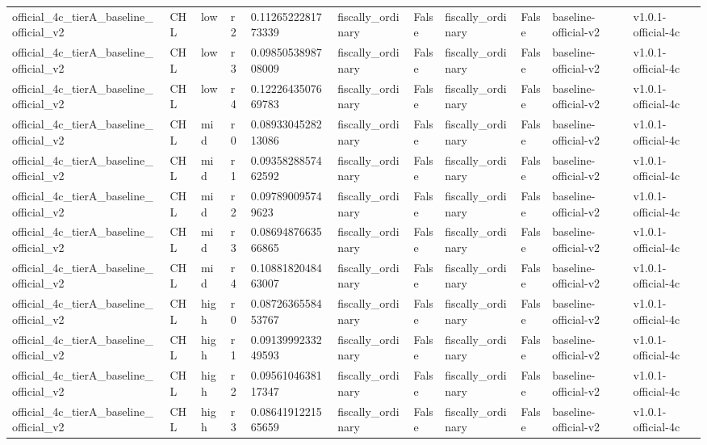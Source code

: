 \begin{table}[!htbp]
\begin{tabular}{lllllllllll}
official\_4c\_tierA\_baseline\_official\_v2 & CHL & low & r2 & 0.1126522281773339 & fiscally\_ordinary & False & fiscally\_ordinary & False & baseline-official-v2 & v1.0.1-official-4c \\
official\_4c\_tierA\_baseline\_official\_v2 & CHL & low & r3 & 0.0985053898708009 & fiscally\_ordinary & False & fiscally\_ordinary & False & baseline-official-v2 & v1.0.1-official-4c \\
official\_4c\_tierA\_baseline\_official\_v2 & CHL & low & r4 & 0.1222643507669783 & fiscally\_ordinary & False & fiscally\_ordinary & False & baseline-official-v2 & v1.0.1-official-4c \\
official\_4c\_tierA\_baseline\_official\_v2 & CHL & mid & r0 & 0.0893304528213086 & fiscally\_ordinary & False & fiscally\_ordinary & False & baseline-official-v2 & v1.0.1-official-4c \\
official\_4c\_tierA\_baseline\_official\_v2 & CHL & mid & r1 & 0.0935828857462592 & fiscally\_ordinary & False & fiscally\_ordinary & False & baseline-official-v2 & v1.0.1-official-4c \\
official\_4c\_tierA\_baseline\_official\_v2 & CHL & mid & r2 & 0.097890095749623 & fiscally\_ordinary & False & fiscally\_ordinary & False & baseline-official-v2 & v1.0.1-official-4c \\
official\_4c\_tierA\_baseline\_official\_v2 & CHL & mid & r3 & 0.0869487663566865 & fiscally\_ordinary & False & fiscally\_ordinary & False & baseline-official-v2 & v1.0.1-official-4c \\
official\_4c\_tierA\_baseline\_official\_v2 & CHL & mid & r4 & 0.1088182048463007 & fiscally\_ordinary & False & fiscally\_ordinary & False & baseline-official-v2 & v1.0.1-official-4c \\
official\_4c\_tierA\_baseline\_official\_v2 & CHL & high & r0 & 0.0872636558453767 & fiscally\_ordinary & False & fiscally\_ordinary & False & baseline-official-v2 & v1.0.1-official-4c \\
official\_4c\_tierA\_baseline\_official\_v2 & CHL & high & r1 & 0.0913999233249593 & fiscally\_ordinary & False & fiscally\_ordinary & False & baseline-official-v2 & v1.0.1-official-4c \\
official\_4c\_tierA\_baseline\_official\_v2 & CHL & high & r2 & 0.0956104638117347 & fiscally\_ordinary & False & fiscally\_ordinary & False & baseline-official-v2 & v1.0.1-official-4c \\
official\_4c\_tierA\_baseline\_official\_v2 & CHL & high & r3 & 0.0864191221565659 & fiscally\_ordinary & False & fiscally\_ordinary & False & baseline-official-v2 & v1.0.1-official-4c \\

\end{tabular}
\end{table}
